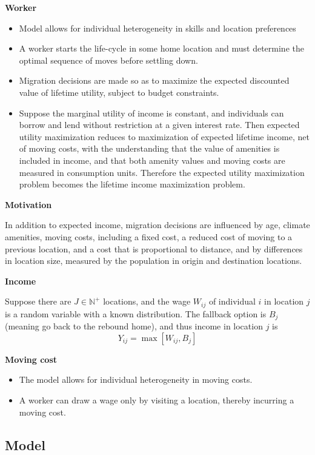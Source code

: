 \documentclass{article}
\numberwithin{equation}{section} %
\begin{document}
\textbf{Worker}
\begin{itemize}
  \item Model allows for individual heterogeneity in skills and location preferences
  \item A worker starts the life-cycle in some home location and must determine the optimal sequence of moves before settling down. 
  \item Migration decisions are made so as to maximize the expected discounted  value of lifetime utility, subject to budget constraints. 
  \item Suppose the marginal utility of income is constant, and individuals can borrow and lend without restriction at a given interest rate. Then expected utility maximization reduces to maximization of expected lifetime income, net of moving costs, with the understanding that the value of amenities is included in income, and that both amenity values and moving costs are measured in consumption units. Therefore the expected utility maximization problem becomes the lifetime income maximization problem.
\end{itemize}

\textbf{Motivation}

In addition to expected income, migration decisions are influenced by age, climate amenities, moving costs, including a fixed cost, a reduced cost of moving to a previous location, and a cost that is proportional to distance, and by differences in location size, measured by the population in origin and destination locations.

\textbf{Income}

Suppose there are $J\in \mathbb{N}^+$ locations, and the wage $W_{ij}$ of individual $i$ in location $j$ is a random variable  with a known distribution. The fallback option is $B_j$ (meaning go back to the rebound home), and thus income in location $j$ is 
\begin{equation}
  Y_{ij} =  \max [W_{ij},B_j]
\end{equation}

\textbf{Moving cost}
\begin{itemize}
  \item The model allows for individual heterogeneity in moving costs.
  \item A worker can draw a  wage only by visiting a location, thereby incurring a moving cost.
\end{itemize}


\subsection{Model} %
\end{document}
